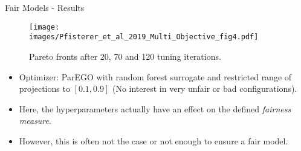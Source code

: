 \begin{frame}{Fair Models - Results}

  \begin{figure}
    \centering
    \texttt{[image: images/Pfisterer\_et\_al\_2019\_Multi\_Objective\_fig4.pdf]}
    \caption{Pareto fronts after 20, 70 and 120 tuning iterations.}
  \end{figure}

\begin{itemize}
  \item Optimizer: ParEGO with random forest surrogate and restricted range of projections to $[0.1, 0.9]$ (No interest in very unfair or bad configurations).
  \item Here, the hyperparameters actually have an effect on the defined \emph{fairness measure}.
  \item However, this is often not the case or not enough to ensure a fair model.
\end{itemize}
  

\end{frame}




